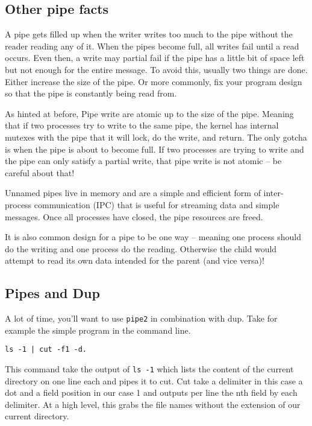 \subsection{Other pipe facts}

A pipe gets filled up when the writer writes too much to the pipe without the reader reading any of it. When the pipes become full, all writes fail until a read occurs. Even then, a write may partial fail if the pipe has a little bit of space left but not enough for the entire message. To avoid this, usually two things are done. Either increase the size of the pipe. Or more commonly, fix your program design so that the pipe is constantly being read from.

As hinted at before, Pipe write are atomic up to the size of the pipe. Meaning that if two processes try to write to the same pipe, the kernel has internal mutexes with the pipe that it will lock, do the write, and return. The only gotcha is when the pipe is about to become full. If two processes are trying to write and the pipe can only satisfy a partial write, that pipe write is not atomic -- be careful about that!

Unnamed pipes live in memory and are a simple and efficient form of inter-process communication (IPC) that is useful for streaming data and simple messages. Once all processes have closed, the pipe resources are freed.

It is also common design for a pipe to be one way -- meaning one process should do the writing and one process do the reading. Otherwise the child would attempt to read its own data intended for the parent (and vice versa)!

\subsection{Pipes and Dup}

A lot of time, you'll want to use \texttt{pipe2} in combination with dup. Take for example the simple program in the command line.

\begin{verbatim}
ls -1 | cut -f1 -d.
\end{verbatim}

This command take the output of \texttt{ls -1} which lists the content of the current directory on one line each and pipes it to cut.
Cut take a delimiter in this case a dot and a field position in our case 1 and outputs per line the nth field by each delimiter.
At a high level, this grabs the file names without the extension of our current directory.

